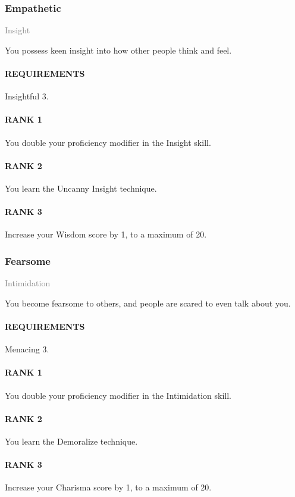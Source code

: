 \subsubsection{Empathetic} \label{feat::empathetic}
\small{\textcolor{gray}{Insight}}

\normalsize
You possess keen insight into how other people think and feel.
\paragraph{REQUIREMENTS} Insightful 3.
\paragraph{RANK 1} You double your proficiency modifier in the Insight skill.
\paragraph{RANK 2} You learn the Uncanny Insight technique.
\paragraph{RANK 3} Increase your Wisdom score by 1, to a maximum of 20.

\subsubsection{Fearsome} \label{feat::fearsome}
\small{\textcolor{gray}{Intimidation}}

\normalsize
You become fearsome to others, and people are scared to even talk about you.
\paragraph{REQUIREMENTS} Menacing 3.
\paragraph{RANK 1} You double your proficiency modifier in the Intimidation skill.
\paragraph{RANK 2} You learn the Demoralize technique.
\paragraph{RANK 3} Increase your Charisma score by 1, to a maximum of 20.


